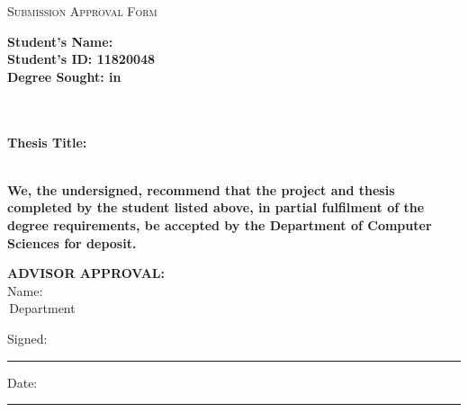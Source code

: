 \documentclass[
11pt, %
english, %
singlespacing, %
headsepline, %
]{MastersDoctoralThesis} %
\begin{document}

\begin{center}
    \Huge\textsc{Submission Approval Form}
\end{center}
\vspace{2cm}



\noindent\textbf{Student’s Name: \authorname}\hrulefill \\
\textbf{Student’s ID: 11820048 }\hrulefill\\
\textbf{Degree Sought: \degreename \; in \subjectname} \\
\vspace{2cm}

\noindent\makebox[\linewidth]{\rule{15 cm}{8pt}} \\ \\
\textbf{Thesis Title: \ttitle}\hrulefill \\ \\
\noindent\makebox[\linewidth]{\rule{15 cm}{8pt}}



\vspace{2cm}
\textbf{We, the undersigned, recommend that the project and thesis completed by the student listed above, in partial fulfilment of the degree requirements, be accepted by the Department of Computer Sciences for deposit.}


\vspace{2cm}
\textbf{ADVISOR APPROVAL:} \\


\noindent Name: \supname \\
\subjectname\,Department \\
\univname

\vspace{2cm}

\noindent Signed:\\
\rule[0.5em]{25em}{0.5pt} %
 
\noindent Date:\\
\rule[0.5em]{25em}{0.5pt} %


\cleardoublepage


\end{document}
